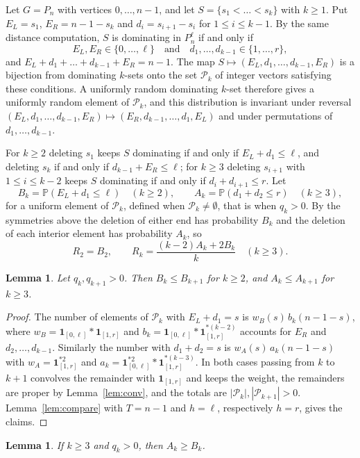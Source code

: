 \documentclass[11pt,a4paper]{amsart}
\newtheorem{lemma}[theorem]{Lemma}
\theoremstyle{definition}
\theoremstyle{remark}
\newcommand{\one}{\mathbf 1}
\newcommand{\Prob}{\mathbb P}
\begin{document}
Let $G=P_n$ with vertices $0,\dots,n-1$, and let $S=\{s_1<\dots<s_k\}$ with $k\ge1$. Put $E_L=s_1$, $E_R=n-1-s_k$ and $d_i=s_{i+1}-s_i$ for $1\le i\le k-1$. By the same distance computation, $S$ is dominating in $P_n^\ell$ if and only if
\[
E_L,E_R\in\{0,\dots,\ell\}\quad\text{and}\quad d_1,\dots,d_{k-1}\in\{1,\dots,r\},
\]
and $E_L+d_1+\dots+d_{k-1}+E_R=n-1$. The map $S\mapsto(E_L,d_1,\dots,d_{k-1},E_R)$ is a bijection from dominating $k$-sets onto the set $\mathcal P_k$ of integer vectors satisfying these conditions. A uniformly random dominating $k$-set therefore gives a uniformly random element of $\mathcal P_k$, and this distribution is invariant under reversal $(E_L,d_1,\dots,d_{k-1},E_R)\mapsto(E_R,d_{k-1},\dots,d_1,E_L)$ and under permutations of $d_1,\dots,d_{k-1}$.

For $k\ge2$ deleting $s_1$ keeps $S$ dominating if and only if $E_L+d_1\le\ell$, and deleting $s_k$ if and only if $d_{k-1}+E_R\le\ell$; for $k\ge3$ deleting $s_{i+1}$ with $1\le i\le k-2$ keeps $S$ dominating if and only if $d_i+d_{i+1}\le r$. Let
\[
B_k=\Prob(E_L+d_1\le\ell)\quad(k\ge2),\qquad A_k=\Prob(d_1+d_2\le r)\quad(k\ge3),
\]
for a uniform element of $\mathcal P_k$, defined when $\mathcal P_k\ne\emptyset$, that is when $q_k>0$. By the symmetries above the deletion of either end has probability $B_k$ and the deletion of each interior element has probability $A_k$, so
\[
R_2=B_2,\qquad R_k=\frac{(k-2)A_k+2B_k}{k}\quad(k\ge3).
\]

\begin{lemma}\label{lem:AB}
Let $q_k,q_{k+1}>0$. Then $B_k\le B_{k+1}$ for $k\ge 2$, and $A_k\le A_{k+1}$ for $k\ge3$.
\end{lemma}

\begin{proof}
The number of elements of $\mathcal P_k$ with $E_L+d_1=s$ is $w_B(s)\,b_k(n-1-s)$, where $w_B=\one_{[0,\ell]}*\one_{[1,r]}$ and $b_k=\one_{[0,\ell]}*\one_{[1,r]}^{*(k-2)}$ accounts for $E_R$ and $d_2,\dots,d_{k-1}$. Similarly the number with $d_1+d_2=s$ is $w_A(s)\,a_k(n-1-s)$ with $w_A=\one_{[1,r]}^{*2}$ and $a_k=\one_{[0,\ell]}^{*2}*\one_{[1,r]}^{*(k-3)}$. In both cases passing from $k$ to $k+1$ convolves the remainder with $\one_{[1,r]}$ and keeps the weight, the remainders are proper by Lemma~\ref{lem:conv}, and the totals are $|\mathcal P_k|,|\mathcal P_{k+1}|>0$. Lemma~\ref{lem:compare} with $T=n-1$ and $h=\ell$, respectively $h=r$, gives the claims.
\end{proof}

\begin{lemma}\label{lem:AgeB}
If $k\ge3$ and $q_k>0$, then $A_k\ge B_k$.
\end{lemma}
\end{document}
